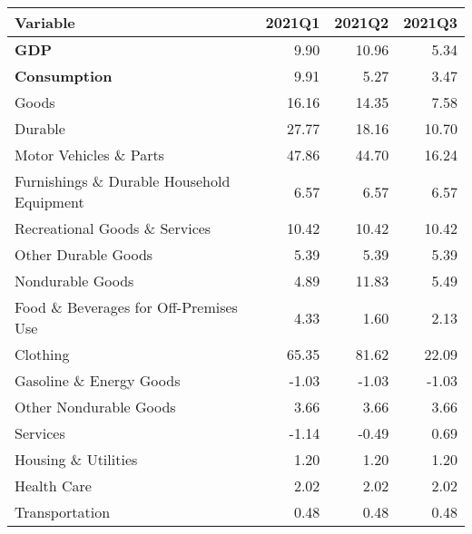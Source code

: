 \documentclass[11pt, letterpaper]{article}\usepackage[]{graphicx}\usepackage[]{color}
\begin{document}
\begin{table}[H]
\centering
\begingroup\fontsize{10pt}{12pt}\selectfont
\begin{tabular}{lrrr}
  \hline
Variable & 2021Q1 & 2021Q2 & 2021Q3 \\ 
  \hline
\hspace{0mm} \textbf{GDP} & 9.90 & 10.96 & 5.34 \\ 
  \hspace{0mm} \textbf{Consumption} & 9.91 & 5.27 & 3.47 \\ 
  \hspace{8mm}  Goods & 16.16 & 14.35 & 7.58 \\ 
  \hspace{16mm}  Durable & 27.77 & 18.16 & 10.70 \\ 
  \hspace{24mm}  Motor Vehicles \& Parts & 47.86 & 44.70 & 16.24 \\ 
  \hspace{24mm}  Furnishings \& Durable Household Equipment & 6.57 & 6.57 & 6.57 \\ 
  \hspace{24mm}  Recreational Goods \& Services & 10.42 & 10.42 & 10.42 \\ 
  \hspace{24mm}  Other Durable Goods & 5.39 & 5.39 & 5.39 \\ 
  \hspace{16mm}  Nondurable Goods & 4.89 & 11.83 & 5.49 \\ 
  \hspace{24mm}  Food \& Beverages for Off-Premises Use & 4.33 & 1.60 & 2.13 \\ 
  \hspace{24mm}  Clothing & 65.35 & 81.62 & 22.09 \\ 
  \hspace{24mm}  Gasoline \& Energy Goods & -1.03 & -1.03 & -1.03 \\ 
  \hspace{24mm}  Other Nondurable Goods & 3.66 & 3.66 & 3.66 \\ 
  \hspace{8mm}  Services & -1.14 & -0.49 & 0.69 \\ 
  \hspace{16mm}  Housing \& Utilities & 1.20 & 1.20 & 1.20 \\ 
  \hspace{16mm}  Health Care & 2.02 & 2.02 & 2.02 \\ 
  \hspace{16mm}  Transportation & 0.48 & 0.48 & 0.48 \\ 

\end{tabular}
\end{table}
\end{document}
